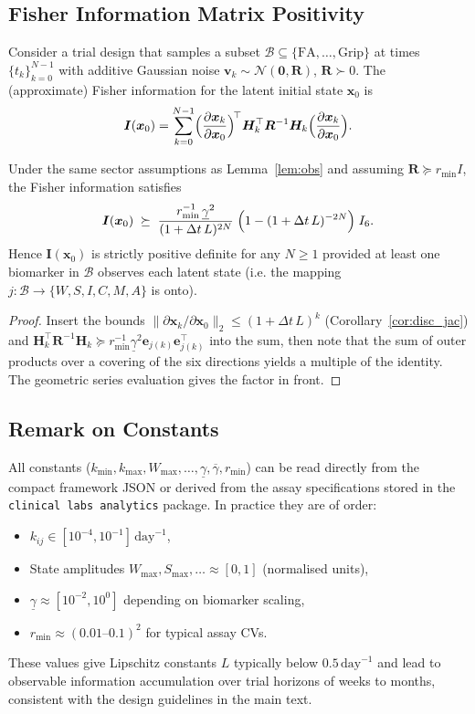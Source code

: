 \documentclass[11pt]{article}
\begin{document}
\subsection{Fisher Information Matrix Positivity}
\label{sub:fim}

Consider a trial design that samples a subset $\mathcal{B}\subseteq\{\text{FA},\dots,\text{Grip}\}$ at times $\{t_{k}\}_{k=0}^{N-1}$ with additive Gaussian noise $\bm{v}_{k}\sim\mathcal{N}(\bm{0},\bm{R})$, $\bm{R}\succ0$. The (approximate) Fisher information for the latent initial state $\bm{x}_{0}$ is
\[
\bm{I}(\bm{x}_{0})
=
\sum_{k=0}^{N-1}
\Bigl(\frac{\partial\bm{x}_{k}}{\partial\bm{x}_{0}}\Bigr)^{\!\top}
\bm{H}_{k}^{\top}\bm{R}^{-1}\bm{H}_{k}
\Bigl(\frac{\partial\bm{x}_{k}}{\partial\bm{x}_{0}}\Bigr).
\]

\begin{proposition}\label{prop:fim}
Under the same sector assumptions as Lemma~\ref{lem:obs} and assuming $\bm{R}\succeq r_{\min}I$, the Fisher information satisfies
\[
\bm{I}(\bm{x}_{0})\;\succeq\;
\frac{r_{\min}^{-1}\,\underline{\gamma}^{2}}{(1+\Delta t\,L)^{2N}}
\;\Bigl(1-(1+\Delta t\,L)^{-2N}\Bigr)\;I_{6}.
\]
Hence $\bm{I}(\bm{x}_{0})$ is strictly positive definite for any $N\ge1$ provided at least one biomarker in $\mathcal{B}$ observes each latent state (i.e. the mapping $j:\mathcal{B}\to\{W,S,I,C,M,A\}$ is onto).
\end{proposition}
\begin{proof}
Insert the bounds $\|\partial\bm{x}_{k}/\partial\bm{x}_{0}\|_{2}\le(1+\Delta t\,L)^{k}$ (Corollary~\ref{cor:disc_jac}) and $\bm{H}_{k}^{\top}\bm{R}^{-1}\bm{H}_{k}\succeq r_{\min}^{-1}\underline{\gamma}^{2}\bm{e}_{j(k)}\bm{e}_{j(k)}^{\top}$ into the sum, then note that the sum of outer products over a covering of the six directions yields a multiple of the identity. The geometric series evaluation gives the factor in front.
\end{proof}

\subsection{Remark on Constants}
All constants ($k_{\min},k_{\max},W_{\max},\dots,\underline{\gamma},\overline{\gamma},r_{\min}$) can be read directly from the compact framework JSON or derived from the assay specifications stored in the \texttt{clinical labs analytics} package. In practice they are of order:
\begin{itemize}
\item $k_{ij}\in[10^{-4},10^{-1}]\,\text{day}^{-1}$,
\item State amplitudes $W_{\max},S_{\max},\dots\approx[0,1]$ (normalised units),
\item $\underline{\gamma}\approx[10^{-2},10^{0}]$ depending on biomarker scaling,
\item $r_{\min}\approx(0.01\text{–}0.1)^{2}$ for typical assay CVs.
\end{itemize}
These values give Lipschitz constants $L$ typically below $0.5\,\text{day}^{-1}$ and lead to observable information accumulation over trial horizons of weeks to months, consistent with the design guidelines in the main text.

\nocite{*}
  

\end{document}
